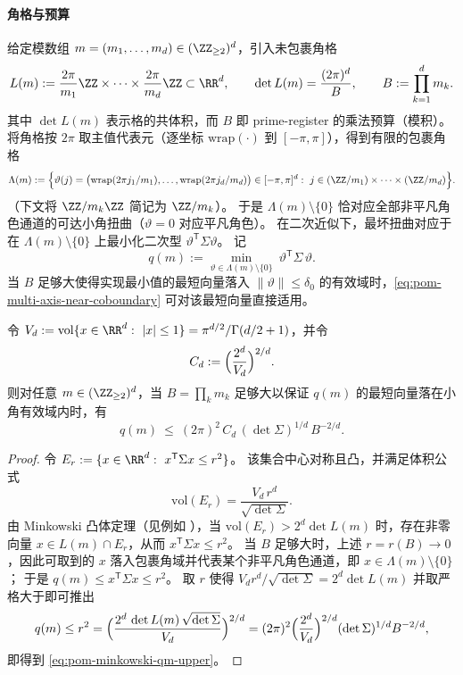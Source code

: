 \paragraph{角格与预算}
给定模数组 \(m=(m_1,\dots,m_d)\in(\ZZ_{\ge 2})^d\)，引入未包裹角格
\[
L(m):=\frac{2\pi}{m_1}\ZZ\times\cdots\times\frac{2\pi}{m_d}\ZZ\subset\RR^d,
\qquad
\det L(m)=\frac{(2\pi)^d}{B},
\qquad
B:=\prod_{k=1}^d m_k.
\]
其中 \(\det L(m)\) 表示格的共体积，而 \(B\) 即 prime-register 的乘法预算（模积）。
将角格按 \(2\pi\) 取主值代表元（逐坐标 \(\mathrm{wrap}(\cdot)\) 到 \([-\pi,\pi]\)），得到有限的包裹角格
\[
\Lambda(m):=\Bigl\{\vartheta(j)
=\bigl(\mathrm{wrap}(2\pi j_1/m_1),\dots,\mathrm{wrap}(2\pi j_d/m_d)\bigr)\in[-\pi,\pi]^d:\ j\in(\ZZ/m_1)\times\cdots\times(\ZZ/m_d)\Bigr\}.
\]
（下文将 \(\ZZ/m_k\ZZ\) 简记为 \(\ZZ/m_k\)）。
于是 \(\Lambda(m)\setminus\{0\}\) 恰对应全部非平凡角色通道的可达小角扭曲（\(\vartheta=0\) 对应平凡角色）。
在二次近似下，最坏扭曲对应于在 \(\Lambda(m)\setminus\{0\}\) 上最小化二次型 \(\vartheta^{\mathsf T}\Sigma\vartheta\)。
记
\begin{equation}\label{eq:pom-multi-axis-qm}
q(m):=\min_{\vartheta\in\Lambda(m)\setminus\{0\}}\ \vartheta^{\mathsf T}\Sigma\,\vartheta.
\end{equation}
当 \(B\) 足够大使得实现最小值的最短向量落入 \(\|\vartheta\|\le\delta_0\) 的有效域时，\eqref{eq:pom-multi-axis-near-coboundary} 可对该最短向量直接适用。

\begin{theorem}\label{thm:pom-minkowski-budget-barrier}
令 \(V_d:=\mathrm{vol}\{x\in\RR^d:\ |x|\le 1\}=\pi^{d/2}/\Gamma(d/2+1)\)，并令
\[
C_d:=\Bigl(\frac{2^{d}}{V_d}\Bigr)^{2/d}.
\]
则对任意 \(m\in(\ZZ_{\ge 2})^d\)，当 \(B=\prod_k m_k\) 足够大以保证 \(q(m)\) 的最短向量落在小角有效域内时，有
\begin{equation}\label{eq:pom-minkowski-qm-upper}
q(m)\ \le\ (2\pi)^2\,C_d\,(\det\Sigma)^{1/d}\,B^{-2/d}.
\end{equation}
\end{theorem}

\begin{proof}
令 \(E_r:=\{x\in\RR^d:\ x^{\mathsf T}\Sigma x\le r^2\}\)。
该集合中心对称且凸，并满足体积公式
\[
\mathrm{vol}(E_r)=\frac{V_d\,r^d}{\sqrt{\det\Sigma}}.
\]
由 Minkowski 凸体定理（见例如 \cite{Cassels1957}），当 \(\mathrm{vol}(E_r)>2^d\det L(m)\) 时，存在非零向量 \(x\in L(m)\cap E_r\)，从而 \(x^{\mathsf T}\Sigma x\le r^2\)。
当 \(B\) 足够大时，上述 \(r=r(B)\to 0\)，因此可取到的 \(x\) 落入包裹角域并代表某个非平凡角色通道，即 \(x\in\Lambda(m)\setminus\{0\}\)；
于是 \(q(m)\le x^{\mathsf T}\Sigma x\le r^2\)。
取 \(r\) 使得
\(
V_d r^d/\sqrt{\det\Sigma}=2^d\det L(m)
\)
并取严格大于即可推出
\[
q(m)
\le r^2
=\Bigl(\frac{2^d\,\det L(m)\,\sqrt{\det\Sigma}}{V_d}\Bigr)^{2/d}
=(2\pi)^2\Bigl(\frac{2^d}{V_d}\Bigr)^{2/d}(\det\Sigma)^{1/d}B^{-2/d},
\]
即得到 \eqref{eq:pom-minkowski-qm-upper}。
\end{proof}

